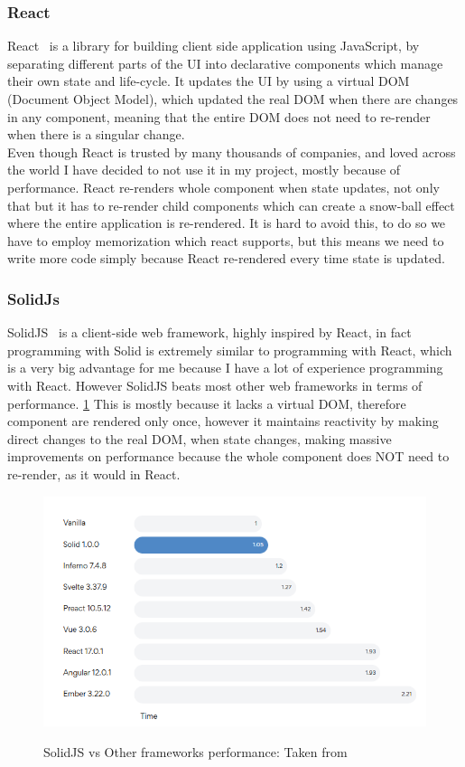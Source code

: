 \documentclass[titlepage]{article}
\begin{document}
\subsubsection{React}
React~\cite{react} is a library for building client side application using JavaScript, by separating different parts of the UI into declarative components which manage their own state and life-cycle. It updates the UI by using a virtual DOM (Document Object Model), which updated the real DOM when there are changes in any component, meaning that the entire DOM does not need to re-render when there is a singular change. \\

Even though React is trusted by many thousands of companies, and loved across the world I have decided to not use it in my project, mostly because of performance. React re-renders whole component when state updates, not only that but it has to re-render child components which can create a snow-ball effect where the entire application is re-rendered. It is hard to avoid this, to do so we have to employ memorization which react supports, but this means we need to write more code simply because React re-rendered every time state is updated. \\

\subsubsection{SolidJs}
SolidJS~\cite{solid} is a client-side web framework, highly inspired by React, in fact programming with Solid is extremely similar to programming with React, which is a very big advantage for me because I have a lot of experience programming with React. However SolidJS beats most other web frameworks in terms of performance. \ref{solidvsworld} This is mostly because it lacks a virtual DOM, therefore component are rendered only once, however it maintains reactivity by making direct changes to the real DOM, when state changes, making massive improvements on performance because the whole component does NOT need to re-render, as it would in React. \\


\begin{figure}
\includegraphics[width=1\textwidth]{solidjs_perf.png}
  \label{solidvsworld}
  \caption{SolidJS vs Other frameworks performance: Taken from~\cite{solid}}
\centering
\end{figure}
\end{document}
